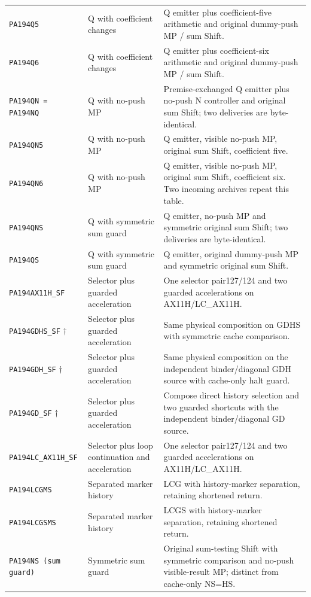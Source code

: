 \begin{longtable}{@{}>{\raggedright\arraybackslash}p{}>{\raggedright\arraybackslash}p{}>{\raggedright\arraybackslash}p{}@{}}
\nolinkurl{PA194Q5} & Q with coefficient changes & Q emitter plus coefficient-five arithmetic and original dummy-push MP / sum Shift.\\
\nolinkurl{PA194Q6} & Q with coefficient changes & Q emitter plus coefficient-six arithmetic and original dummy-push MP / sum Shift.\\
\nolinkurl{PA194QN = PA194NQ} & Q with no-push MP & Premise-exchanged Q emitter plus no-push N controller and original sum Shift; two deliveries are byte-identical.\\
\nolinkurl{PA194QN5} & Q with no-push MP & Q emitter, visible no-push MP, original sum Shift, coefficient five.\\
\nolinkurl{PA194QN6} & Q with no-push MP & Q emitter, visible no-push MP, original sum Shift, coefficient six. Two incoming archives repeat this table.\\
\nolinkurl{PA194QNS} & Q with symmetric sum guard & Q emitter, no-push MP and symmetric original sum Shift; two deliveries are byte-identical.\\
\nolinkurl{PA194QS} & Q with symmetric sum guard & Q emitter, original dummy-push MP and symmetric original sum Shift.\\
\nolinkurl{PA194AX11H_SF} & Selector plus guarded acceleration & One selector pair127/124 and two guarded accelerations on AX11H/LC\_AX11H.\\
\nolinkurl{PA194GDHS_SF} $\dagger$ & Selector plus guarded acceleration & Same physical composition on GDHS with symmetric cache comparison.\\
\nolinkurl{PA194GDH_SF} $\dagger$ & Selector plus guarded acceleration & Same physical composition on the independent binder/diagonal GDH source with cache-only halt guard.\\
\nolinkurl{PA194GD_SF} $\dagger$ & Selector plus guarded acceleration & Compose direct history selection and two guarded shortcuts with the independent binder/diagonal GD source.\\
\nolinkurl{PA194LC_AX11H_SF} & Selector plus loop continuation and acceleration & One selector pair127/124 and two guarded accelerations on AX11H/LC\_AX11H.\\
\nolinkurl{PA194LCGMS} & Separated marker history & LCG with history-marker separation, retaining shortened return.\\
\nolinkurl{PA194LCGSMS} & Separated marker history & LCGS with history-marker separation, retaining shortened return.\\
\nolinkurl{PA194NS (sum guard)} & Symmetric sum guard & Original sum-testing Shift with symmetric comparison and no-push visible-result MP; distinct from cache-only NS=HS.\\

\end{longtable}
